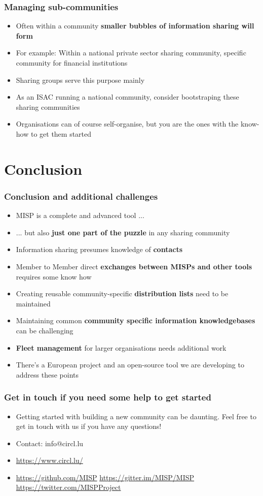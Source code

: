 \begin{frame}
\frametitle{Managing sub-communities}
\begin{itemize}
    \item Often within a community {\bf smaller bubbles of information sharing will form}
	\item For example: Within a national private sector sharing community, specific community for financial institutions
	\item Sharing groups serve this purpose mainly
	\item As an ISAC running a national community, consider bootstraping these sharing communities
	\item Organisations can of course self-organise, but you are the ones with the know-how to get them started
\end{itemize}
\end{frame}

\section{Conclusion}

\begin{frame}
	\frametitle{Conclusion and additional challenges}
	\begin{itemize}
		\item MISP is a complete and advanced tool ...
		\item ... but also {\bf just one part of the puzzle} in any sharing community
		\item Information sharing presumes knowledge of {\bf contacts}
		\item Member to Member direct {\bf exchanges between MISPs and other tools} requires some know how
		\item Creating reusable community-specific {\bf distribution lists} need to be maintained
		\item Maintaining common {\bf community specific information knowledgebases} can be challenging
		\item {\bf Fleet management} for larger organisations needs additional work
        \item There's a European project and an open-source tool we are developing to address these points
	\end{itemize}
\end{frame}

\begin{frame}
	\frametitle{Get in touch if you need some help to get started}
	\begin{itemize}
		\item Getting started with building a new community can be daunting. Feel free to get in touch with us if you have any questions!
		\item Contact: info@circl.lu
		\item \url{https://www.circl.lu/}
		\item \url{https://github.com/MISP}  \url{https://gitter.im/MISP/MISP}  \url{https://twitter.com/MISPProject}
	\end{itemize}
\end{frame}

